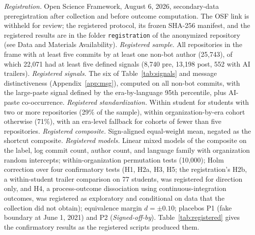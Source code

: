 \documentclass[acmsmall,screen,review,anonymous]{acmart}
\begin{document}
\textit{Registration.} Open Science Framework, August 6, 2026, secondary-data preregistration after collection and before outcome computation. The OSF link is withheld for review; the registered protocol, its frozen SHA-256 manifest, and the registered results are in the folder \texttt{registration} of the anonymized repository (see Data and Materials Availability). \textit{Registered sample.} All repositories in the frame with at least five commits by at least one non-bot author (25,743), of which 22,071 had at least five defined signals (8,740 pre, 13,198 post, 552 with AI trailers). \textit{Registered signals.} The six of Table~\ref{tab:signals} and message distinctiveness (Appendix~\ref{app:msg}), computed on all non-bot commits, with the large-paste signal defined by the era-by-language 95th percentile, plus AI-paste co-occurrence. \textit{Registered standardization.} Within student for students with two or more repositories (29\% of the sample), within organization-by-era cohort otherwise (71\%), with an era-level fallback for cohorts of fewer than five repositories. \textit{Registered composite.} Sign-aligned equal-weight mean, negated as the shortcut composite. \textit{Registered models.} Linear mixed models of the composite on the label, log commit count, author count, and language family with organization random intercepts; within-organization permutation tests (10,000); Holm correction over four confirmatory tests (H1, H2a, H3, H5; the registration's H2b, a within-student trailer comparison on 77 students, was registered for direction only, and H4, a process-outcome dissociation using continuous-integration outcomes, was registered as exploratory and conditional on data that the collection did not obtain); equivalence margin $d = \pm 0.10$; placebos P1 (fake boundary at June 1, 2021) and P2 (\textit{Signed-off-by}). Table~\ref{tab:registered} gives the confirmatory results as the registered scripts produced them.
\end{document}
